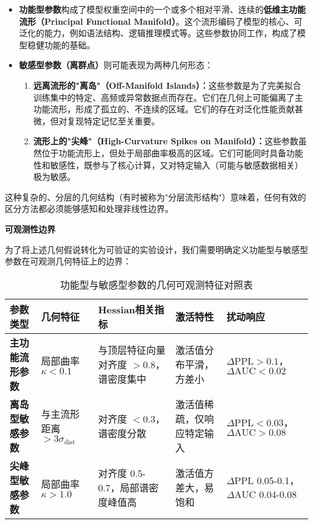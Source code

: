 \documentclass[letterpaper,twocolumn,10pt]{article}
\begin{document}
\begin{itemize}
\item \textbf{功能型参数}构成了模型权重空间中的一个或多个相对平滑、连续的\textbf{低维主功能流形（Principal Functional Manifold）}。这个流形编码了模型的核心、可泛化的能力，例如语法结构、逻辑推理模式等。这些参数协同工作，构成了模型稳健功能的基础。

\item \textbf{敏感型参数（离群点）}则可能表现为两种几何形态：
\begin{enumerate}
\item \textbf{远离流形的"离岛"（Off-Manifold Islands）：}这些参数是为了完美拟合训练集中的特定、高频或异常数据点而存在。它们在几何上可能偏离了主功能流形，形成了孤立的、不连续的区域。它们的存在对泛化性能贡献甚微，但对复现特定记忆至关重要。

\item \textbf{流形上的"尖峰"（High-Curvature Spikes on Manifold）：}这些参数虽然位于功能流形上，但处于局部曲率极高的区域。它们可能同时具备功能性和敏感性，既参与了核心计算，又对特定输入（可能与敏感数据相关）极为敏感。
\end{enumerate}
\end{itemize}

这种复杂的、分层的几何结构（有时被称为"分层流形结构"）意味着，任何有效的区分方法都必须能够感知和处理非线性边界。

\textbf{可观测性边界}

为了将上述几何假说转化为可验证的实验设计，我们需要明确定义功能型与敏感型参数在可观测几何特征上的边界：

\begin{table*}[t]
\centering
\scriptsize
\caption{功能型与敏感型参数的几何可观测特征对照表}
\begin{tabular}{@{}p{2.2cm}p{2.0cm}p{2.3cm}p{2.0cm}p{2.2cm}@{}}
\toprule
\textbf{参数类型} & \textbf{几何特征} & \textbf{Hessian相关指标} & \textbf{激活特性} & \textbf{扰动响应} \\
\midrule
\textbf{主功能流形参数} & 局部曲率 $\kappa < 0.1$ & 
与顶层特征向量对齐度 $> 0.8$，谱密度集中 & 
激活值分布平滑，方差小 & 
$\Delta \text{PPL} > 0.1$，$\Delta \text{AUC} < 0.02$ \\
\midrule
\textbf{离岛型敏感参数} & 
与主流形距离 $> 3\sigma_{\text{dist}}$ & 
对齐度 $< 0.3$，谱密度分散 & 
激活值稀疏，仅响应特定输入 & 
$\Delta \text{PPL} < 0.03$，$\Delta \text{AUC} > 0.08$ \\
\midrule
\textbf{尖峰型敏感参数} & 局部曲率 $\kappa > 1.0$ & 
对齐度 0.5-0.7，局部谱密度峰值高 & 
激活值方差大，易饱和 & 
$\Delta \text{PPL}$ 0.05-0.1，$\Delta \text{AUC}$ 0.04-0.08 \\
\bottomrule
\end{tabular}
\label{tab:observability}
\end{table*}
\end{document}
